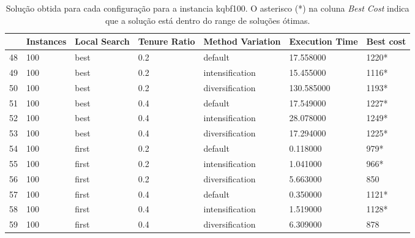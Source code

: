 \begin{table}
\centering
\begin{tabular}{lllllll}
\toprule
{} & Instances & Local Search & Tenure Ratio & Method Variation & Execution Time & Best cost \\
\midrule
48 &       100 &         best &          0.2 &          default &    17.558000 &      1220* \\
49 &       100 &         best &          0.2 &  intensification &    15.455000 &      1116* \\
50 &       100 &         best &          0.2 &  diversification &   130.585000 &      1193* \\
51 &       100 &         best &          0.4 &          default &    17.549000 &      1227* \\
52 &       100 &         best &          0.4 &  intensification &    28.078000 &      1249* \\
53 &       100 &         best &          0.4 &  diversification &    17.294000 &      1225* \\
54 &       100 &        first &          0.2 &          default &     0.118000 &       979* \\
55 &       100 &        first &          0.2 &  intensification &     1.041000 &       966* \\
56 &       100 &        first &          0.2 &  diversification &     5.663000 &       850 \\
57 &       100 &        first &          0.4 &          default &     0.350000 &      1121* \\
58 &       100 &        first &          0.4 &  intensification &     1.519000 &      1128* \\
59 &       100 &        first &          0.4 &  diversification &     6.309000 &       878 \\
\bottomrule
\end{tabular}
\caption{Solução obtida para cada configuração para a instancia kqbf100. O asterisco (*) na coluna \textit{Best Cost} indica que a solução está dentro do range de soluções ótimas.}
\label{table:all-data-4}
\end{table}

